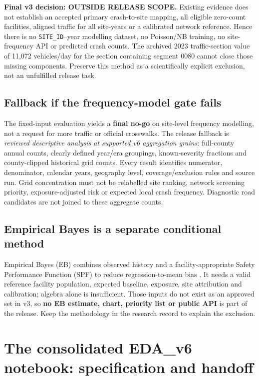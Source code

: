 \documentclass[11pt,a4paper,openany]{report}
\newcommand{\pathcode}[1]{\nolinkurl{#1}}
\begin{document}
\textbf{Final v3 decision: OUTSIDE RELEASE SCOPE.} Existing evidence does not establish an accepted primary crash-to-site mapping, all eligible zero-count facilities, aligned traffic for all site-years or a calibrated network reference. Hence there is no \pathcode{SITE_ID}--year modelling dataset, no Poisson/NB training, no site-frequency API or predicted crash counts. The archived 2023 traffic-section value of 11,072 vehicles/day for the section containing segment 0080 cannot close those missing components. Preserve this method as a scientifically explicit exclusion, not an unfulfilled release task.

\section{Fallback if the frequency-model gate fails}
The fixed-input evaluation yields a \textbf{final no-go} on site-level frequency modelling, not a request for more traffic or official crosswalks. The release fallback is \emph{reviewed descriptive analysis at supported v6 aggregation grains}: full-county annual counts, clearly defined year/era groupings, known-severity fractions and county-clipped historical grid counts. Every result identifies numerator, denominator, calendar years, geography level, coverage/exclusion rules and source run. Grid concentration must not be relabelled site ranking, network screening priority, exposure-adjusted risk or expected local crash frequency. Diagnostic road candidates are not joined to these aggregate counts.

\section{Empirical Bayes is a separate conditional method}
Empirical Bayes (EB) combines observed history and a facility-appropriate Safety Performance Function (SPF) to reduce regression-to-mean bias \cite{FHWA_EB}. It needs a valid reference facility population, expected baseline, exposure, site attribution and calibration; algebra alone is insufficient. Those inputs do not exist as an approved set in v3, so \textbf{no EB estimate, chart, priority list or public API} is part of the release. Keep the methodology in the research record to explain the exclusion.

\chapter{The consolidated EDA\_v6 notebook: specification and handoff}
\end{document}
